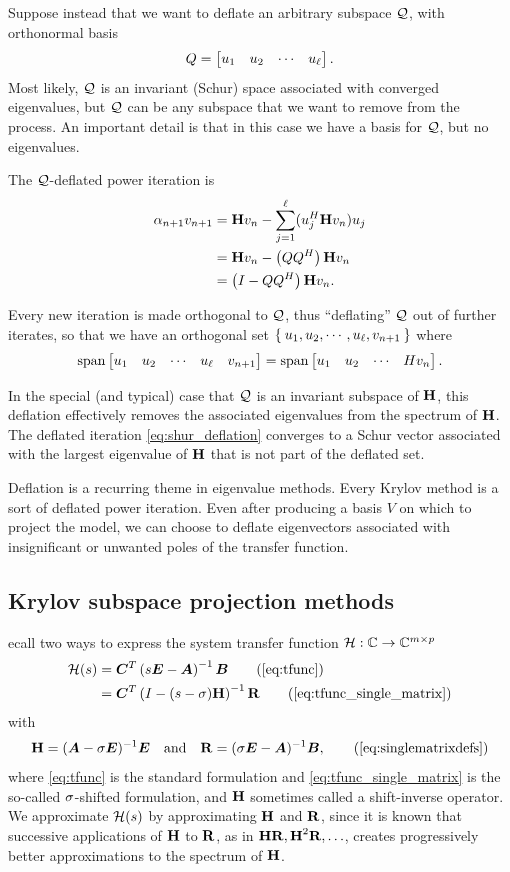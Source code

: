 Suppose instead that we want to deflate an arbitrary subspace $\mathcal{Q}$, with orthonormal basis 
\[
Q =\begin{bmatrix} u_1 & u_2 & \cdots & u_\ell\end{bmatrix}.
\]
   Most likely, $\mathcal{Q}$ is an invariant (Schur) space associated with converged eigenvalues, but $\mathcal{Q}$ can be any subspace that we want to remove from the process.  An important detail is that in this case we have a basis for $\mathcal{Q}$, but no eigenvalues.
   
The $\mathcal{Q}$-deflated power iteration is
   \begin{align}
\alpha_{n+1 }v_{n+1} &= \textbf{\textup{H}} v_n - \sum_{j=1}^\ell (u_j^H \textbf{\textup{H}} v_n) u_j \nonumber\\
&= \textbf{\textup{H}} v_n  - \left( Q  Q^H \right) \textbf{\textup{H}} v_n\nonumber\\
 &= \left(I - Q Q^H \right) \textbf{\textup{H}} v_n \label{eq:shur_deflation}.
\end{align}

Every new iteration is made orthogonal to $\mathcal{Q}$, thus ``deflating'' $\mathcal{Q}$ out of further iterates, so that we have  an orthogonal set $\Set{u_1, u_2, \cdots ,u_\ell, v_{n+1}}$ where 
\[
\operatorname*{span}\begin{bmatrix} u_1 & u_2 & \cdots & u_\ell & v_{n+1}\end{bmatrix} = \operatorname*{span} \begin{bmatrix} u_1 & u_2 & \cdots & H v_n\end{bmatrix}.
\]  

In the special (and typical) case that $\mathcal{Q}$ is an invariant subspace of $\textbf{\textup{H}}$, this deflation effectively removes the associated eigenvalues from the spectrum of $\textbf{\textup{H}}$.  The deflated iteration \eqref{eq:shur_deflation} converges to a Schur vector associated with the largest eigenvalue of $\textbf{\textup{H}}$ that is not part of the deflated set.

Deflation is a recurring theme in eigenvalue methods.  Every Krylov method is a sort of deflated power iteration.     Even after producing a basis $V$ on which to project the model, we can choose to deflate eigenvectors associated with insignificant or unwanted poles of the transfer function. 


\clearpage
\subsection{Krylov subspace projection methods}\label{sec:projection}
ecall two ways to express the system transfer function $\mathcal{H}:\mathbb{C} \rightarrow \mathbb{C}^{m \times p}$
\begin{align}
                \tf(s) &= \CC^T\left(s\E-\A\right)^{-1}\BB \tag{\ref{eq:tfunc}}\\
		&=  \CC^T\left(I-(s-\xp)\H\right)^{-1} \RR \tag{\ref{eq:tfunc_single_matrix}}
\end{align}
with
 \begin{equation}
                        \H = (\A - \xp \E)^{-1}\E\quad\textrm{and}\quad \RR = (\xp \E-\A)^{-1}\BB, 
        \tag{\ref{eq:singlematrixdefs}}
 \end{equation}
where \eqref{eq:tfunc} is the standard formulation and \eqref{eq:tfunc_single_matrix} is the so-called $\sigma$-shifted formulation, and $\textbf{\textup{H}}$ sometimes called a shift-inverse operator.  We approximate $\mathcal{H}(s)$ by approximating $\textbf{\textup{H}}$ and $\textbf{\textup{R}}$, since it is known that successive applications of $\textbf{\textup{H}}$ to $\textbf{\textup{R}}$, as in $\textbf{\textup{H}}\textbf{\textup{R}}, \textbf{\textup{H}}^2\textbf{\textup{R}},\ldots$, creates progressively better approximations to the spectrum of $\textbf{\textup{H}}$.   

